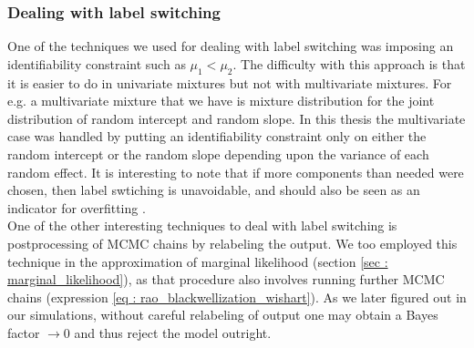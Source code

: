 \subsubsection{Dealing with label switching}
One of the techniques we used for dealing with label switching was imposing an identifiability constraint such as $\mu_1 < \mu_2$. The difficulty with this approach is that it is easier to do in univariate mixtures but not with multivariate mixtures. For e.g. a multivariate mixture that we have is mixture distribution for the joint distribution of random intercept and random slope. In this thesis the multivariate case was handled by putting an identifiability constraint only on either the random intercept or the random slope depending upon the variance of each random effect. It is interesting to note that if more components than needed were chosen, then label swtiching is unavoidable, and should also be seen as an indicator for overfitting \citep[pg. 104]{fruhwirth-schnatter_finite_2013}.\\

One of the other interesting techniques to deal with label switching is postprocessing of MCMC chains by relabeling the output\citep{richardson_bayesian_1997,stephens_dealing_2000}. We too employed this technique in the approximation of marginal likelihood (section \ref{sec : marginal_likelihood}), as that procedure also involves running further MCMC chains (expression \ref{eq : rao_blackwellization_wishart}). As we later figured out in our simulations, without careful relabeling of output one may obtain a Bayes factor $\to 0$ and thus reject the model outright.